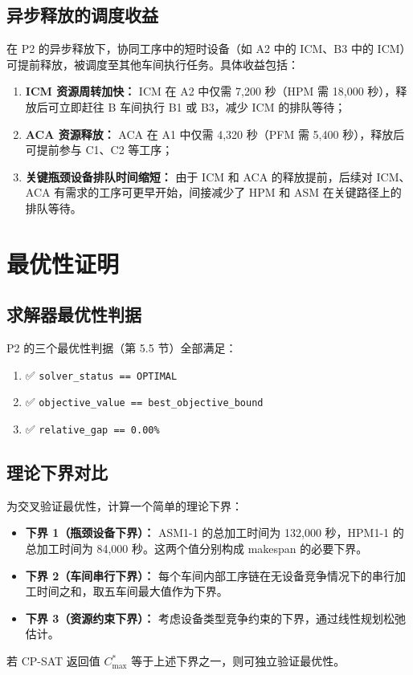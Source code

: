 \documentclass[UTF8,a4paper,12pt]{ctexart}
\begin{document}
\subsection{异步释放的调度收益}
在 P2 的异步释放下，协同工序中的短时设备（如 A2 中的 ICM、B3 中的 ICM）可提前释放，被调度至其他车间执行任务。具体收益包括：
\begin{enumerate}
  \item \textbf{ICM 资源周转加快：} ICM 在 A2 中仅需 7,200 秒（HPM 需 18,000 秒），释放后可立即赶往 B 车间执行 B1 或 B3，减少 ICM 的排队等待；
  \item \textbf{ACA 资源释放：} ACA 在 A1 中仅需 4,320 秒（PFM 需 5,400 秒），释放后可提前参与 C1、C2 等工序；
  \item \textbf{关键瓶颈设备排队时间缩短：} 由于 ICM 和 ACA 的释放提前，后续对 ICM、ACA 有需求的工序可更早开始，间接减少了 HPM 和 ASM 在关键路径上的排队等待。
\end{enumerate}

\section{最优性证明}
\subsection{求解器最优性判据}
P2 的三个最优性判据（第 5.5 节）全部满足：
\begin{enumerate}
  \item ✅ \texttt{solver\_status == OPTIMAL}
  \item ✅ \texttt{objective\_value == best\_objective\_bound}
  \item ✅ \texttt{relative\_gap == 0.00\%}
\end{enumerate}

\subsection{理论下界对比}
为交叉验证最优性，计算一个简单的理论下界：
\begin{itemize}
  \item \textbf{下界 1（瓶颈设备下界）：} ASM1-1 的总加工时间为 132,000 秒，HPM1-1 的总加工时间为 84,000 秒。这两个值分别构成 makespan 的必要下界。
  \item \textbf{下界 2（车间串行下界）：} 每个车间内部工序链在无设备竞争情况下的串行加工时间之和，取五车间最大值作为下界。
  \item \textbf{下界 3（资源约束下界）：} 考虑设备类型竞争约束的下界，通过线性规划松弛估计。
\end{itemize}
若 CP-SAT 返回值 $C_{\max}^*$ 等于上述下界之一，则可独立验证最优性。
\end{document}
